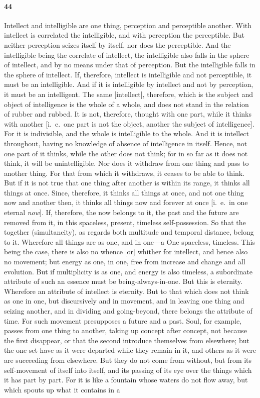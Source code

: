 \documentclass[12pt]{article}
\begin{document}
\paragraph{44} Intellect and intelligible are one thing, perception and perceptible another. With intellect is correlated the intelligible, and with perception the perceptible. But neither perception seizes itself by itself, nor does the perceptible. And the intelligible being the correlate of intellect, the intelligible also falls in the sphere of intellect, and by no means under that of perception. But the intelligible falls in the sphere of intellect. If, therefore, intellect is intelligible and not perceptible, it must be an intelligible. And if it is intelligible by intellect and not by perception, it must be an intelligent. The same [intellect], therefore, which is the subject and object of intelligence is the whole of a whole, and does not stand in the relation of rubber and rubbed. It is not, therefore, thought with one part, while it thinks with another [i.~e.~one part is not the object, another the subject of intelligence]. For it is indivisible, and the whole is intelligible to the whole. And it is intellect throughout, having no knowledge of absence of intelligence in itself. Hence, not one part of it thinks, while the other does not think; for in so far as it does not think, it will be unintelligible. Nor does it withdraw from one thing and pass to another thing. For that from which it withdraws, it ceases to be able to think. But if it is not true that one thing after another is within its range, it thinks all things at once. Since, therefore, it thinks all things at once, and not one thing now and another then, it thinks all things now and forever at once [i.~e.~in one eternal \textit{now}]. If, therefore, the now belongs to it, the past and the future are removed from it, in this spaceless, present, timeless self-possession. So that the together (simultaneity), as regards both multitude and temporal distance, belong to it. Wherefore all things are as one, and in one---a One spaceless, timeless. This being the case, there is also no whence [or] whither for intellect, and hence also no movement; but energy as one, in one, free from increase and change and all evolution. But if multiplicity is as one, and energy is also timeless, a subordinate attribute of such an essence must be being-always-in-one. But this is eternity. Wherefore an attribute of intellect is eternity. But to that which does not think as one in one, but discursively and in movement, and in leaving one thing and seizing another, and in dividing and going-beyond, there belongs the attribute of time. For such movement presupposes a future and a past. Soul, for example, passes from one thing to another, taking up concept after concept, not because the first disappear, or that the second introduce themselves from elsewhere; but the one set have as it were departed while they remain in it, and others as it were are succeeding from elsewhere. But they do not come from without, but from its self-movement of itself into itself, and its passing of its eye over the things which it has part by part. For it is like a fountain whose waters do not flow away, but which spouts up what it contains in a 
\end{document}
